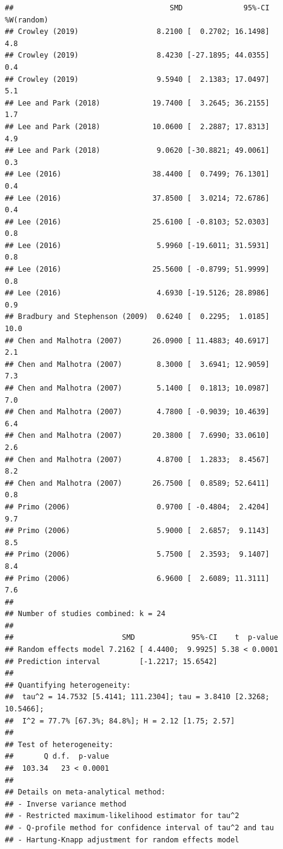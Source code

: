\documentclass[
]{article}
\begin{document}
\begin{verbatim}
##                                    SMD              95%-CI %W(random)
## Crowley (2019)                  8.2100 [  0.2702; 16.1498]        4.8
## Crowley (2019)                  8.4230 [-27.1895; 44.0355]        0.4
## Crowley (2019)                  9.5940 [  2.1383; 17.0497]        5.1
## Lee and Park (2018)            19.7400 [  3.2645; 36.2155]        1.7
## Lee and Park (2018)            10.0600 [  2.2887; 17.8313]        4.9
## Lee and Park (2018)             9.0620 [-30.8821; 49.0061]        0.3
## Lee (2016)                     38.4400 [  0.7499; 76.1301]        0.4
## Lee (2016)                     37.8500 [  3.0214; 72.6786]        0.4
## Lee (2016)                     25.6100 [ -0.8103; 52.0303]        0.8
## Lee (2016)                      5.9960 [-19.6011; 31.5931]        0.8
## Lee (2016)                     25.5600 [ -0.8799; 51.9999]        0.8
## Lee (2016)                      4.6930 [-19.5126; 28.8986]        0.9
## Bradbury and Stephenson (2009)  0.6240 [  0.2295;  1.0185]       10.0
## Chen and Malhotra (2007)       26.0900 [ 11.4883; 40.6917]        2.1
## Chen and Malhotra (2007)        8.3000 [  3.6941; 12.9059]        7.3
## Chen and Malhotra (2007)        5.1400 [  0.1813; 10.0987]        7.0
## Chen and Malhotra (2007)        4.7800 [ -0.9039; 10.4639]        6.4
## Chen and Malhotra (2007)       20.3800 [  7.6990; 33.0610]        2.6
## Chen and Malhotra (2007)        4.8700 [  1.2833;  8.4567]        8.2
## Chen and Malhotra (2007)       26.7500 [  0.8589; 52.6411]        0.8
## Primo (2006)                    0.9700 [ -0.4804;  2.4204]        9.7
## Primo (2006)                    5.9000 [  2.6857;  9.1143]        8.5
## Primo (2006)                    5.7500 [  2.3593;  9.1407]        8.4
## Primo (2006)                    6.9600 [  2.6089; 11.3111]        7.6
## 
## Number of studies combined: k = 24
## 
##                         SMD             95%-CI    t  p-value
## Random effects model 7.2162 [ 4.4400;  9.9925] 5.38 < 0.0001
## Prediction interval         [-1.2217; 15.6542]              
## 
## Quantifying heterogeneity:
##  tau^2 = 14.7532 [5.4141; 111.2304]; tau = 3.8410 [2.3268; 10.5466];
##  I^2 = 77.7% [67.3%; 84.8%]; H = 2.12 [1.75; 2.57]
## 
## Test of heterogeneity:
##       Q d.f.  p-value
##  103.34   23 < 0.0001
## 
## Details on meta-analytical method:
## - Inverse variance method
## - Restricted maximum-likelihood estimator for tau^2
## - Q-profile method for confidence interval of tau^2 and tau
## - Hartung-Knapp adjustment for random effects model
\end{verbatim}
\end{document}
